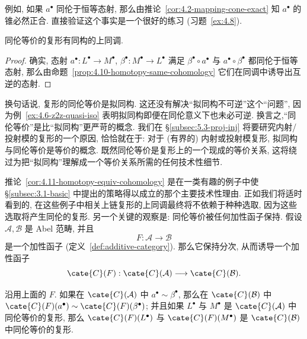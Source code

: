 \indent 例如, 如果 $a^\bullet$ 同伦于恒等态射, 那么由推论~\ref{cor:4.2-mapping-cone-exact} 知 $a^\bullet$ 的锥必然正合. 直接验证这个事实是一个很好的练习 (习题~\ref{ex:4.8}).

\begin{corollary}\label{cor:4.11-homotopy-equiv-cohomology}
同伦等价的复形有同构的上同调.
\end{corollary}

\begin{proof}
确实, 态射 $a^\bullet:L^\bullet\to M^\bullet$, $\beta^\bullet:M^\bullet\to L^\bullet$ 满足 $\beta^\bullet\circ a^\bullet$ 与 $a^\bullet\circ\beta^\bullet$ 都同伦于恒等态射, 那么由命题~\ref{prop:4.10-homotopy-same-cohomology} 它们在同调中诱导出互逆的态射.
\end{proof}

\begin{remark}\label{rmk:4.12-homotopy-equiv-qiso}
换句话说, 复形的同伦等价是拟同构. 这还没有解决``拟同构不可逆''这个``问题'', 因为例~\ref{ex:4.6-z2z-quasi-iso} 表明拟同构即便在同伦意义下也未必可逆. 换言之,``同伦等价''是比``拟同构''更严苛的概念. 我们在 \S\ref{subsec:5.3-proj-inj} 将要研究内射/投射模的复形的一个原因, 恰恰就在于: 对于 (有界的) 内射或投射模复形, 拟同构与同伦等价是等价的概念. 既然同伦等价是复形上的一个现成的等价关系, 这将绕过为把``拟同构''理解成一个等价关系所需的任何技术性细节.
\end{remark}

\indent 推论~\ref{cor:4.11-homotopy-equiv-cohomology} 是在一类有趣的例子中使 \S\ref{subsec:3.1-basic} 中提出的策略得以成立的那个主要技术性理由. 正如我们将适时看到的, 在这些例子中相关上链复形的上同调最终将不依赖于种种选取, 因为这些选取将产生同伦的复形.
另一个关键的观察是: 同伦等价被任何加性函子保持. 假设 $\mathcal A,\mathcal B$ 是 Abel 范畴, 并且
\[
F:\mathcal A\longrightarrow\mathcal B
\]
是一个加性函子 (定义~\ref{def:additive-category}). 那么它保持分次, 从而诱导一个加性函子
\[
\cate{C}(F):\cate{C}(\mathcal A)\longrightarrow\cate{C}(\mathcal B).
\]

\begin{lemma}\label{lem:4.13-additive-functor-homotopy}
沿用上面的 $F$. 如果在 $\cate{C}(\mathcal A)$ 中 $a^\bullet\sim\beta^\bullet$, 那么在 $\cate{C}(\mathcal B)$ 中 $\cate{C}(F)(a^\bullet)\sim\cate{C}(F)(\beta^\bullet)$; 并且如果 $L^\bullet$ 与 $M^\bullet$ 是 $\cate{C}(\mathcal A)$ 中同伦等价的复形, 那么 $\cate{C}(F)(L^\bullet)$ 与 $\cate{C}(F)(M^\bullet)$ 是 $\cate{C}(\mathcal B)$ 中同伦等价的复形.
\end{lemma}


